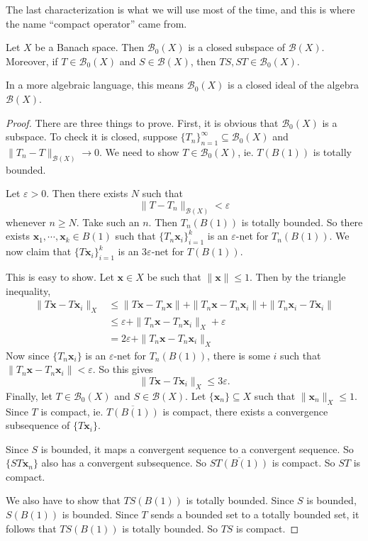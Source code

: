 \documentclass[a4paper]{article}
\begin{document}
The last characterization is what we will use most of the time, and this is where the name ``compact operator'' came from.

\begin{prop}
  Let $X$ be a Banach space. Then $\mathcal{B}_0(X)$ is a closed subspace of $\mathcal{B}(X)$. Moreover, if $T \in \mathcal{B}_0(X)$ and $S \in \mathcal{B}(X)$, then $TS, ST \in \mathcal{B}_0(X)$.

  In a more algebraic language, this means $\mathcal{B}_0(X)$ is a closed ideal of the algebra $\mathcal{B}(X)$.
\end{prop}

\begin{proof}
  There are three things to prove. First, it is obvious that $\mathcal{B}_0(X)$ is a subspace. To check it is closed, suppose $\{T_n\}_{n = 1}^\infty \subseteq \mathcal{B}_0(X)$ and $\|T_n - T\|_{\mathcal{B}(X)} \to 0$. We need to show $T \in \mathcal{B}_0(X)$, ie. $T(B(1))$ is totally bounded.

  Let $\varepsilon > 0$. Then there exists $N$ such that
  \[
    \|T - T_n\|_{\mathcal{B}(X)} < \varepsilon
  \]
  whenever $n \geq N$. Take such an $n$. Then $T_n(B(1))$ is totally bounded. So there exists $\mathbf{x}_1, \cdots, \mathbf{x}_k \in B(1)$ such that $\{T_n \mathbf{x}_i\}_{i = 1}^k$ is an $\varepsilon$-net for $T_n(B(1))$. We now claim that $\{T \mathbf{x}_i\}_{i = 1}^k$ is an $3\varepsilon$-net for $T(B(1))$.

  This is easy to show. Let $\mathbf{x} \in X$ be such that $\|\mathbf{x}\| \leq 1$. Then by the triangle inequality,
  \begin{align*}
    \|T \mathbf{x} - T \mathbf{x}_i\|_X &\leq \| T \mathbf{x} - T_n \mathbf{x}\| + \|T_n \mathbf{x} - T_n \mathbf{x}_i\| + \|T_n \mathbf{x}_i - T \mathbf{x}_i\|\\
    &\leq \varepsilon + \|T_n \mathbf{x} - T_n \mathbf{x}_i\|_X + \varepsilon\\
    &= 2 \varepsilon + \|T_n \mathbf{x} - T_n \mathbf{x}_i\|_X
  \end{align*}
  Now since $\{T_n \mathbf{x}_i\}$ is an $\varepsilon$-net for $T_n (B(1))$, there is some $i$ such that $\|T_n \mathbf{x} - T_n \mathbf{x}_i\| < \varepsilon$. So this gives
  \[
    \|T \mathbf{x} - T \mathbf{x}_i\|_X \leq 3 \varepsilon.
  \]
  Finally, let $T \in \mathcal{B}_0(X)$ and $S \in \mathcal{B}(X)$. Let $\{\mathbf{x}_n \} \subseteq X$ such that $\|\mathbf{x}_n\|_X \leq 1$. Since $T$ is compact, ie. $\overline{T(B(1))}$ is compact, there exists a convergence subsequence of $\{T \mathbf{x}_i\}$.

  Since $S$ is bounded, it maps a convergent sequence to a convergent sequence. So $\{S T \mathbf{x}_n\}$ also has a convergent subsequence. So $\overline{ST(B(1))}$ is compact. So $ST$ is compact.

  We also have to show that $TS(B(1))$ is totally bounded. Since $S$ is bounded, $S(B(1))$ is bounded. Since $T$ sends a bounded set to a totally bounded set, it follows that $TS(B(1))$ is totally bounded. So $TS$ is compact.
\end{proof}
\end{document}
